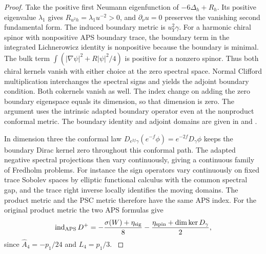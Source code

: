 \begin{proof}
Take the positive first Neumann eigenfunction of
\(-6\Delta_h+R_h\). Its positive eigenvalue \(\lambda_1\)
gives \(R_{u^2h}=\lambda_1u^{-2}>0\), and \(\partial_\nu u=0\)
preserves the vanishing second fundamental form. The induced
boundary metric is \(u_Y^2\gamma\).
For a harmonic chiral spinor with nonpositive APS boundary
trace, the boundary term in the integrated Lichnerowicz identity
is nonpositive because the boundary is minimal. The bulk
term \(\int(|\nabla\psi|^2+R|\psi|^2/4)\) is positive for a
nonzero spinor. Thus both chiral kernels vanish with either
choice at the zero spectral space. Normal Clifford multiplication
interchanges the spectral signs and yields the adjoint boundary
condition. Both cokernels vanish as well. The index change on
adding the zero boundary eigenspace equals its dimension,
so that dimension is zero. The argument uses the intrinsic
adapted boundary operator even at the nonproduct conformal
metric.
The boundary identity and adjoint domains are given in
\cite[(13), (16)--(17), Theorem~6]{HijaziMontielZhang2001Boundary}
and \cite[Examples 4.21 and 5.12, Corollary 6.2]{BaerBallmann2016Guide}.

In dimension three the conformal law
\(D_{e^{2f}\gamma}(e^{-f}\phi)=e^{-2f}D_\gamma\phi\)
keeps the boundary Dirac kernel zero throughout this conformal
path. The adapted negative spectral projections then vary
continuously, giving a continuous family of Fredholm problems.
For instance the sign operators vary continuously on fixed
trace Sobolev spaces by elliptic functional calculus with the
common spectral gap, and the trace right inverse locally
identifies the moving domains. The product metric and the
PSC metric therefore have the same APS index. For the original
product metric the two APS formulas give
\[
 \operatorname{ind}_{\mathrm{APS}}D^+
 =-\frac{\sigma(W)+\eta_{\rm sig}}8
    -\frac{\eta_{\rm spin}+\dim\ker D_\gamma}{2},
\]
since \(\widehat A_4=-p_1/24\) and \(L_4=p_1/3\).
\cite[Theorems (4.2) and (4.14)]{APS1975SpectralI}
\end{proof}

